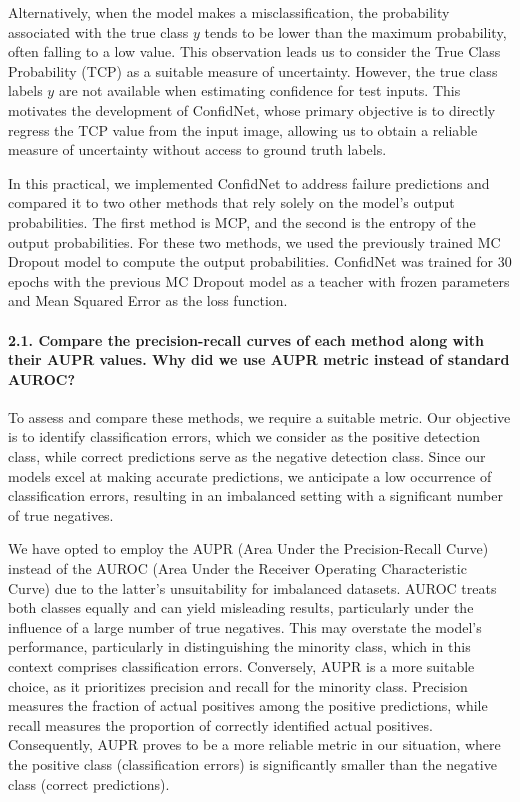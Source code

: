 Alternatively, when the model makes a misclassification, the probability associated with the true class $y$ tends to be lower than the maximum probability, often falling to a low value. This observation leads us to consider the True Class Probability (TCP) as a suitable measure of uncertainty. However, the true class labels $y$ are not available when estimating confidence for test inputs. This motivates the development of ConfidNet, whose primary objective is to directly regress the TCP value from the input image, allowing us to obtain a reliable measure of uncertainty without access to ground truth labels.

In this practical, we implemented ConfidNet to address failure predictions and compared it to two other methods that rely solely on the model's output probabilities. The first method is MCP, and the second is the entropy of the output probabilities. For these two methods, we used the previously trained MC Dropout model to compute the output probabilities. ConfidNet was trained for 30 epochs with the previous MC Dropout model as a teacher with frozen parameters and Mean Squared Error as the loss function.

\paragraph*{2.1. Compare the precision-recall curves of each method along with their AUPR values. Why did we use AUPR metric instead of standard AUROC?}
To assess and compare these methods, we require a suitable metric. Our objective is to identify classification errors, which we consider as the positive detection class, while correct predictions serve as the negative detection class. Since our models excel at making accurate predictions, we anticipate a low occurrence of classification errors, resulting in an imbalanced setting with a significant number of true negatives.

We have opted to employ the AUPR (Area Under the Precision-Recall Curve) instead of the AUROC (Area Under the Receiver Operating Characteristic Curve) due to the latter's unsuitability for imbalanced datasets. AUROC treats both classes equally and can yield misleading results, particularly under the influence of a large number of true negatives. This may overstate the model's performance, particularly in distinguishing the minority class, which in this context comprises classification errors. Conversely, AUPR is a more suitable choice, as it prioritizes precision and recall for the minority class. Precision measures the fraction of actual positives among the positive predictions, while recall measures the proportion of correctly identified actual positives. Consequently, AUPR proves to be a more reliable metric in our situation, where the positive class (classification errors) is significantly smaller than the negative class (correct predictions).


